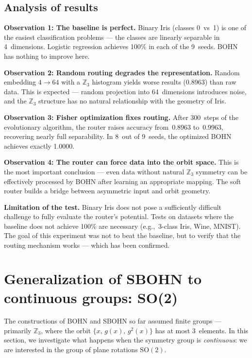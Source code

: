 \documentclass[11pt,a4paper]{report}
\begin{document}
\subsection{Analysis of results}

\textbf{Observation 1: The baseline is perfect.} Binary Iris (classes 0~vs~1) is one of the easiest classification problems --- the classes are linearly separable in 4~dimensions. Logistic regression achieves 100\% in each of the 9~seeds. BOHN has nothing to improve here.

\textbf{Observation 2: Random routing degrades the representation.} Random embedding $4 \to 64$ with a $\mathbb{Z}_3$ histogram yields worse results (0.8963) than raw data. This is expected --- random projection into 64~dimensions introduces noise, and the $\mathbb{Z}_3$ structure has no natural relationship with the geometry of Iris.

\textbf{Observation 3: Fisher optimization fixes routing.} After 300~steps of the evolutionary algorithm, the router raises accuracy from~0.8963 to~0.9963, recovering nearly full separability. In 8~out of 9~seeds, the optimized BOHN achieves exactly 1.0000.

\textbf{Observation 4: The router can force data into the orbit space.} This is the most important conclusion --- even data without natural $\mathbb{Z}_3$ symmetry can be effectively processed by BOHN after learning an appropriate mapping. The soft router builds a bridge between asymmetric input and orbit geometry.

\textbf{Limitation of the test.} Binary Iris does not pose a sufficiently difficult challenge to fully evaluate the router's potential. Tests on datasets where the baseline does not achieve 100\% are necessary (e.g.,~3-class Iris, Wine, MNIST). The goal of this experiment was not to beat the baseline, but to verify that the routing mechanism works --- which has been confirmed.



\section{Generalization of SBOHN to continuous groups: SO(2)}

The constructions of BOHN and SBOHN so far assumed finite groups ---
primarily $\mathbb{Z}_3$, where the orbit $\{x,\,g(x),\,g^2(x)\}$ has at most 3~elements. In this section, we investigate what happens when the symmetry group is \emph{continuous}: we are interested in the group of plane rotations $\mathrm{SO}(2)$.
\end{document}
